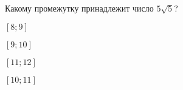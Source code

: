 \begin{ex}
	\begin{condition}
		Какому промежутку принадлежит число \(5\sqrt{5}\)?
		
		\selectanswer
		\begin{enumcols}[columns=4]
			\item $[8;9]$
			\item $[9;10]$
			\item $[11;12]$
			\item $[10;11]$
		\end{enumcols}
	\end{condition}
\end{ex}